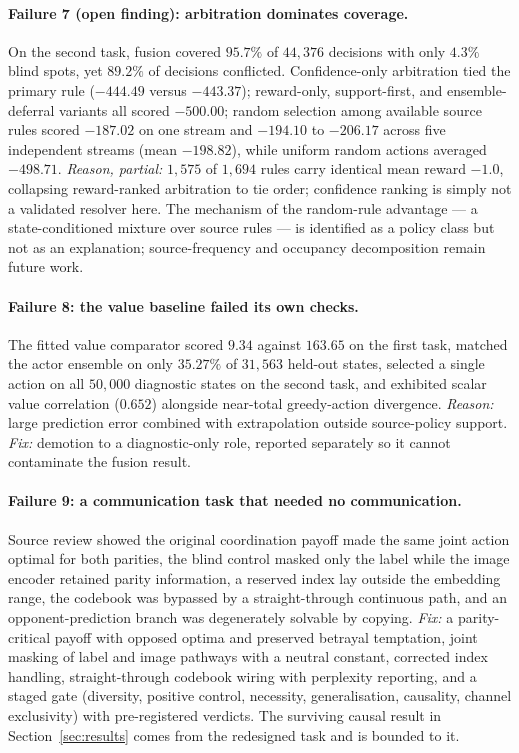 \documentclass[11pt,a4paper]{article}
\theoremstyle{definition}
\begin{document}
\paragraph{Failure 7 (open finding): arbitration dominates coverage.}
On the second task, fusion covered $95.7\%$ of $44{,}376$ decisions with only
$4.3\%$ blind spots, yet $89.2\%$ of decisions conflicted. Confidence-only
arbitration tied the primary rule ($-444.49$ versus $-443.37$); reward-only,
support-first, and ensemble-deferral variants all scored $-500.00$; random
selection among available source rules scored $-187.02$ on one stream and
$-194.10$ to $-206.17$ across five independent streams (mean $-198.82$),
while uniform random actions averaged $-498.71$. \emph{Reason, partial:}
$1{,}575$ of $1{,}694$ rules carry identical mean reward $-1.0$, collapsing
reward-ranked arbitration to tie order; confidence ranking is simply not a
validated resolver here. The mechanism of the random-rule advantage ---
a state-conditioned mixture over source rules --- is identified as a policy
class but not as an explanation; source-frequency and occupancy decomposition
remain future work.

\paragraph{Failure 8: the value baseline failed its own checks.}
The fitted value comparator scored $9.34$ against $163.65$ on the first task,
matched the actor ensemble on only $35.27\%$ of $31{,}563$ held-out states,
selected a single action on all $50{,}000$ diagnostic states on the second
task, and exhibited scalar value correlation ($0.652$) alongside near-total
greedy-action divergence. \emph{Reason:} large prediction error combined with
extrapolation outside source-policy support. \emph{Fix:} demotion to a
diagnostic-only role, reported separately so it cannot contaminate the fusion
result.

\paragraph{Failure 9: a communication task that needed no communication.}
Source review showed the original coordination payoff made the same joint
action optimal for both parities, the blind control masked only the label
while the image encoder retained parity information, a reserved index lay
outside the embedding range, the codebook was bypassed by a straight-through
continuous path, and an opponent-prediction branch was degenerately solvable
by copying. \emph{Fix:} a parity-critical payoff with opposed optima and
preserved betrayal temptation, joint masking of label and image pathways with
a neutral constant, corrected index handling, straight-through codebook
wiring with perplexity reporting, and a staged gate (diversity, positive
control, necessity, generalisation, causality, channel exclusivity) with
pre-registered verdicts. The surviving causal result in Section~\ref{sec:results}
comes from the redesigned task and is bounded to it.
\end{document}
